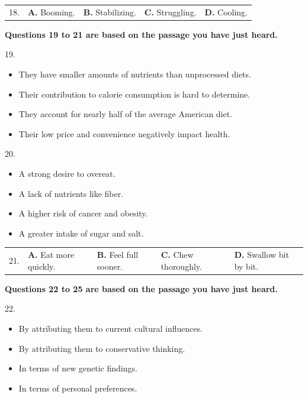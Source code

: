 \documentclass[UTF8,11pt]{ctexart}
\begin{document}
\noindent\begin{tabularx}{\linewidth}{@{}lXXXX@{}}18. & \textbf{A.} Booming. & \textbf{B.} Stabilizing. & \textbf{C.} Struggling. & \textbf{D.} Cooling.\\\end{tabularx}\par

\textbf{Questions 19 to 21 are based on the passage you have just heard.}


19.


\begin{itemize}[leftmargin=2em,itemsep=.2em,topsep=.4em]\item[A.] They have smaller amounts of nutrients than unprocessed diets.
\item[B.] Their contribution to calorie consumption is hard to determine.
\item[C.] They account for nearly half of the average American diet.
\item[D.] Their low price and convenience negatively impact health.
\end{itemize}

20.


\begin{itemize}[leftmargin=2em,itemsep=.2em,topsep=.4em]\item[A.] A strong desire to overeat.
\item[B.] A lack of nutrients like fiber.
\item[C.] A higher risk of cancer and obesity.
\item[D.] A greater intake of sugar and salt.
\end{itemize}

\noindent\begin{tabularx}{\linewidth}{@{}lXXXX@{}}21. & \textbf{A.} Eat more quickly. & \textbf{B.} Feel full sooner. & \textbf{C.} Chew thoroughly. & \textbf{D.} Swallow bit by bit.\\\end{tabularx}\par

\textbf{Questions 22 to 25 are based on the passage you have just heard.}


22.


\begin{itemize}[leftmargin=2em,itemsep=.2em,topsep=.4em]\item[A.] By attributing them to current cultural influences.
\item[B.] By attributing them to conservative thinking.
\item[C.] In terms of new genetic findings.
\item[D.] In terms of personal preferences.
\end{itemize}
\end{document}

